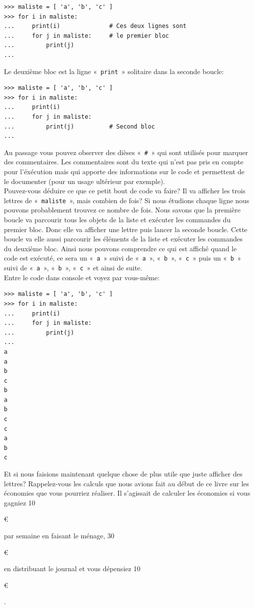 \begin{Verbatim}[frame=single,rulecolor=\color{gray}, label=ne pas saisir]
>>> maliste = [ 'a', 'b', 'c' ]
>>> for i in maliste:
...     print(i)              # Ces deux lignes sont
...     for j in maliste:     # le premier bloc
...         print(j)
...
\end{Verbatim}

Le deuxième bloc est la ligne «~\texttt{print}~» solitaire dans la seconde boucle:

\begin{Verbatim}[frame=single,rulecolor=\color{gray}, label=ne pas saisir]
>>> maliste = [ 'a', 'b', 'c' ]
>>> for i in maliste:
...     print(i) 
...     for j in maliste:
...         print(j)          # Second bloc
...
\end{Verbatim}

Au passage vous pouvez observer des dièses «~\texttt{\#}~» qui sont utilisés pour marquer des commentaires. Les commentaires sont du texte qui n'est pas pris en compte pour l'éxécution mais qui apporte des informations sur le code et permettent de le documenter (pour un usage ultérieur par exemple).\\


Pouvez-vous déduire ce que ce petit bout de code va faire?
Il va afficher les trois lettres de «~\texttt{maliste}~», mais combien de fois?
Si nous étudions chaque ligne nous pouvons probablement trouvez ce nombre de fois.
Nous savons que la première boucle va parcourir tous les objets de la liste et exécuter
les commandes du premier bloc. Donc elle va afficher une lettre puis lancer la seconde boucle. Cette boucle va elle aussi parcourir les éléments de la liste et exécuter les commandes du deuxième bloc. Ainsi nous pouvons comprendre ce qui est affiché quand le code est exécuté, ce sera un «~\texttt{a}~»  suivi de «~\texttt{a}~», «~\texttt{b}~», «~\texttt{c}~» puis un «~\texttt{b}~»  suivi de «~\texttt{a}~», «~\texttt{b}~», «~\texttt{c}~» et ainsi de suite.\\

Entre le code dans console et voyez par vous-même:

\begin{Verbatim}[frame=single,rulecolor=\color{green}, label=à saisir avec attention]
>>> maliste = [ 'a', 'b', 'c' ]
>>> for i in maliste:
...     print(i)
...     for j in maliste:
...         print(j)
...
a
a
b
c
b
a
b
c
c
a
b
c
\end{Verbatim}

Et si nous faisions maintenant quelque chose de plus utile que juste afficher des lettres?
Rappelez-vous les calculs que nous avions fait au début de ce livre sur les économies que vous pourriez réaliser. Il s'agissait de calculer les économies si vous gagniez 10\begin{small}\euro\end{small} par semaine en faisant le ménage, 30\begin{small}\euro\end{small} en distribuant le journal et vous dépensiez 10\begin{small}\euro\end{small}.\\

